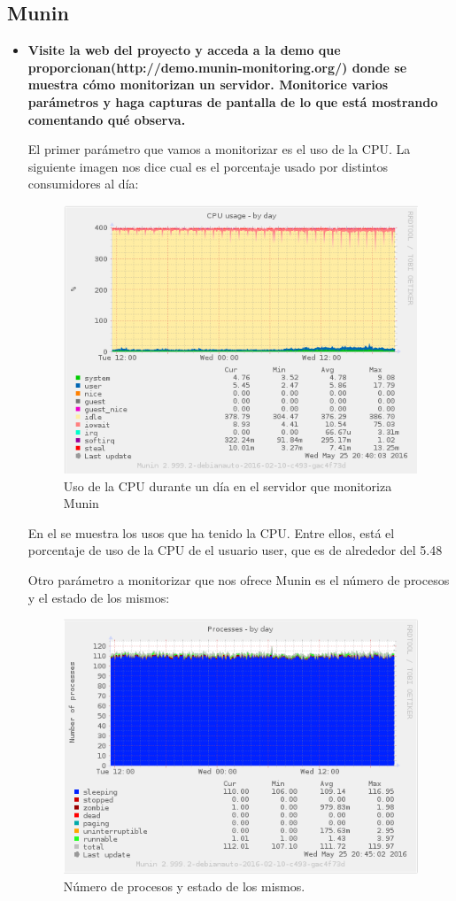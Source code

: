 \subsection{Munin}
\begin{itemize}
	\item \textbf{Visite la web del proyecto y acceda a la demo que proporcionan(http://demo.munin-monitoring.org/) donde se muestra cómo monitorizan un servidor. Monitorice varios parámetros y haga capturas de pantalla de lo que está mostrando comentando qué observa.}
	
	El primer parámetro que vamos a monitorizar es el uso de la CPU. La siguiente imagen nos dice cual es el porcentaje usado por distintos consumidores al día:\\
	
	\begin{figure}[H]
	\centering
	\includegraphics[width=0.7\linewidth]{monitoring_munin_cpu}
	\caption[CPUusage]{Uso de la CPU durante un día en el servidor que monitoriza Munin}
	\label{fig:monitoring_munin_cpu}
	\end{figure}
	
	En el se muestra los usos que ha tenido la CPU. Entre ellos, está el porcentaje de uso de la CPU de el usuario user, que es de alrededor del 5.48%
	
	Otro parámetro a monitorizar que nos ofrece Munin es el número de procesos y el estado de los mismos:\\
	
	\begin{figure}[H]
	\centering
	\includegraphics[width=0.7\linewidth]{monitorin_munin_procesos}
	\caption[ProcesosMunin]{Número de procesos y estado de los mismos.}
	\label{fig:monitorin_munin_procesos}
	\end{figure}
	

\end{itemize}
